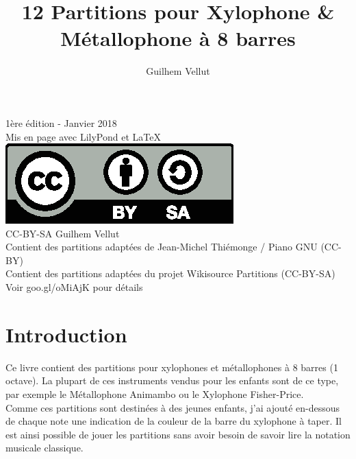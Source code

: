 \documentclass[17pt,letterpaper]{extarticle}
\title{12 Partitions pour Xylophone \& Métallophone à 8 barres}
\author{Guilhem Vellut}
\date{}
\makeatletter
\def\clearleftpage{\clearpage\ifodd\c@page\else
\hbox{}\newpage\if@twocolumn\hbox{}\newpage\fi\fi}
\makeatother
\begin{document}
\setcounter{secnumdepth}{-1}
\setcounter{page}{1}

\maketitle

\clearpage
\vspace*{\fill}

{\tiny 1ère édition - Janvier 2018 \\ Mis en page avec LilyPond et \LaTeX \\
\newline
\includegraphics{by-sa} \\
\newline
CC-BY-SA Guilhem Vellut\\
Contient des partitions adaptées de Jean-Michel Thiémonge / Piano GNU (CC-BY)\\
Contient des partitions adaptées du projet Wikisource Partitions (CC-BY-SA)\\
Voir goo.gl/oMiAjK pour détails \par}

\clearpage

\tableofcontents

\clearleftpage

\section{Introduction}

Ce livre contient des partitions pour xylophones et métallophones à 8 barres (1 octave). La plupart de ces instruments vendus pour les enfants sont de ce type, par exemple le Métallophone Animambo ou le Xylophone Fisher-Price.\\

Comme ces partitions sont destinées à des jeunes enfants, j'ai ajouté en-dessous de chaque note une indication de la couleur de la barre du xylophone à taper. Il est ainsi possible de jouer les partitions sans avoir besoin de savoir lire la notation musicale classique.\\
\end{document}

